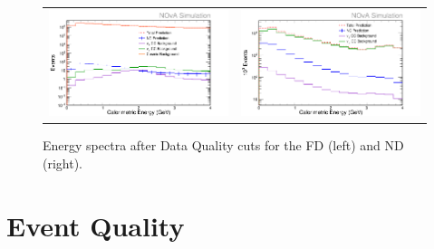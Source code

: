 \begin{figure}[htb]
  \centering
  \begin{tabular}{c c}
    \includegraphics[width=.47\textwidth]{figures/SelE/RecoE0FD.png} &
    \includegraphics[width=.47\linewidth]{figures/SelE/RecoE0ND.png} \\
  \end{tabular}
  \caption[Energy Spectra After Data Quality Cuts]{Energy spectra after Data Quality cuts for the FD (left) and ND (right).}
  \label{fig:NP1DataQual}
\end{figure}

\clearpage
\section{Event Quality}
\label{sec:SelEQ}


